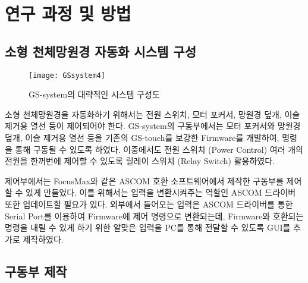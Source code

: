 
\section{연구 과정 및 방법}


\subsection{소형 천체망원경 자동화 시스템 구성}




\begin{figure}[h]
	\begin{center}
		\texttt{[image: GSsystem4]}
	\end{center}
	\caption{GS-system의 대략적인 시스템 구성도}
	\label{GSsystem}
\end{figure}

소형 천체망원경을 자동화하기 위해서는 전원 스위치, 모터 포커서, 망원경 덮개, 이슬 제거용 열선 등이  제어되어야 한다. GS-system의 구동부에서는 모터 포커서와 망원경 덮개, 이슬 제거용 열선 등을 기존의 GS-touch를 보강한 Firmware를 개발하여, 명령을 통해 구동될 수 있도록 하였다. 이중에서도 전원 스위치 (Power Control) \는 여러 개의 전원을 한꺼번에 제어할 수 있도록 릴레이 스위치 (Relay Switch) \를 활용하였다.

제어부에서는 FocusMax와 같은 ASCOM 호환 소프트웨어에서 제작한 구동부를 제어할 수 있게 만들었다. 이를  위해서는 입력을 변환시켜주는 역할인 ASCOM 드라이버 또한 업데이트할 필요가 있다. 외부에서 들어오는 입력은 ASCOM 드라이버를 통한 Serial Port를 이용하여 Firmware에 제어 명령으로 변환되는데, Firmware와 호환되는 명령을 내릴 수 있게 하기 위한 알맞은 입력을 PC를 통해 전달할 수 있도록 GUI를 추가로 제작하였다.

\newpage

\subsection{구동부 제작}


